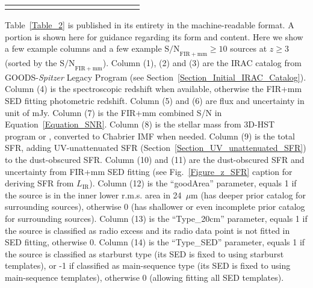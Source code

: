\begin{table*}
\begin{center}
\begin{tabular}{ cccccccccccccc }
    \hline

    \vspace{-0.5ex}


\end{tabular}

\begin{minipage}{0.95\textwidth}
    
    Table~\ref{Table_2} is published in its entirety in the machine-readable format. 
    A portion is shown here for guidance regarding its form and content. 
    Here we show a few example columns and a few example $\mathrm{S/N}_{\mathrm{FIR+mm}} \ge 10$ sources at $z \ge 3$ (sorted by the $\mathrm{S/N}_{\mathrm{FIR+mm}}$). 
    Column (1), (2) and (3) are the IRAC catalog from GOODS-\textit{Spitzer} Legacy Program 
    (see Section~\ref{Section_Initial_IRAC_Catalog}). 
    Column (4) is the spectroscopic redshift when available,  
    otherwise the FIR+mm SED fitting photometric redshift.  
    Column (5) and (6) are flux and uncertainty in unit of mJy.  
    Column (7) is the FIR+mm combined S/N in Equation~\ref{Equation_SNR}.  
    Column (8) is the stellar mass from 3D-HST program or \citet{Pannella2015},  
    converted to Chabrier IMF when needed.  
    Column (9) is the total SFR, adding UV-unattenuated SFR (Section~\ref{Section_UV_unattenuated_SFR}) to the dust-obscured SFR. 
    Column (10) and (11) are the dust-obscured SFR and uncertainty from FIR+mm SED fitting  
    (see Fig.~\ref{Figure_z_SFR}  
    caption for deriving SFR from $L_{\mathrm{IR}}$).  
    Column (12) is the ``goodArea'' parameter,  
    equals 1 if the source is in the inner lower r.m.s. area in 24~$\mu$m  
    (has deeper prior catalog for surrounding sources),  
    otherwise 0 (has shallower or even incomplete prior catalog for surrounding sources).  
    Column (13) is the ``Type\_20cm'' parameter,  
    equals 1 if the source is classified as radio excess and  
    its radio data point is not fitted in SED fitting, otherwise 0.  
    Column (14) is the ``Type\_SED'' parameter,  
    equals 1 if the source is classified as starburst type  
    (its SED is fixed to using starburst templates),  
    or -1 if classified as main-sequence type  
    (its SED is fixed to using main-sequence templates), 
    otherwise 0 (allowing fitting all SED templates). 
    
\end{minipage}

\end{center}

\end{table*}

